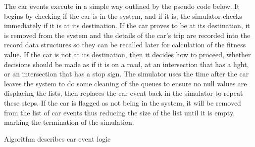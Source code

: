 The car events execute in a simple way outlined by the pseudo code below.  It begins by checking if the car is in the system, and if it is, the simulator checks immediately if it is at its destination.  If the car proves to be at its destination, it is removed from the system and the details of the car's trip are recorded into the record data structures so they can be recalled later for calculation of the fitness value.  If the car is not at its destination, then it decides how to proceed, whether decisions should be made as if it is on a road, at an intersection that has a light, or an intersection that has a stop sign.  The simulator uses the time after the car leaves the system to do some cleaning of the queues to ensure no null values are displacing the lists, then replaces the car event back in the simulator to repeat these steps.  If the car is flagged as not being in the system, it will be removed from the list of car events thus reducing the size of the list until it is empty, marking the termination of the simulation.

\begin{algorithm}[h]
 \SetAlgoLined
  \caption{Algorithm describes car event logic}
\label{Car Event}
\end{algorithm}


